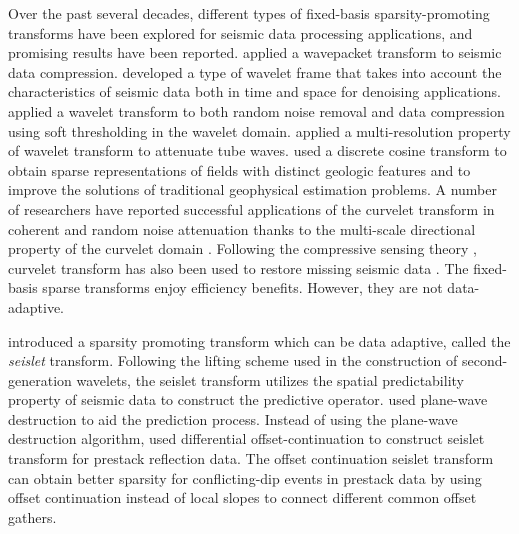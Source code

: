 Over the past several decades, different types of fixed-basis sparsity-promoting transforms have been explored for seismic data processing applications, and promising results have been reported. \cite{luoyi1992} applied a wavepacket transform to seismic data compression. \cite{zhangr2003} developed a type of wavelet frame that takes into account the characteristics of seismic data both in time and space for denoising applications. \cite{ioup1998} applied a wavelet transform to both random noise removal and data compression using soft thresholding in the wavelet domain. \cite{du2000} applied a multi-resolution property of wavelet transform to attenuate tube waves. \cite{jafarpour2009} used a discrete cosine transform to obtain sparse representations of fields with distinct geologic features and to improve the solutions of traditional geophysical estimation problems.%
A number of researchers have reported successful applications of the curvelet transform in coherent and random noise attenuation thanks to the multi-scale directional property of the curvelet domain \cite[]{hennenfent2006,deli2008,neelamani2008,neelamani2010}. %
Following the compressive sensing theory \cite[]{donoho2006}, curvelet transform has also been used to restore missing seismic data \cite[]{hennenfent2010,mostafa2010}.  The fixed-basis sparse transforms enjoy efficiency benefits. However, they are not data-adaptive.

\cite{fomel2010seislet} introduced a sparsity promoting transform which can be data adaptive, called the \emph{seislet} transform. Following the lifting scheme used in the construction of second-generation wavelets, the seislet transform utilizes the spatial predictability property of seismic data to construct the predictive operator. \cite{fomel2010seislet} used plane-wave destruction \cite[]{fomel2002pwd} to aid the prediction process. Instead of using the plane-wave destruction algorithm, \cite{liuyang2010} used differential offset-continuation to construct seislet transform for prestack reflection data. The offset continuation seislet transform can obtain better sparsity for conflicting-dip events in prestack data by using offset continuation instead of local slopes to connect different common offset gathers. %

